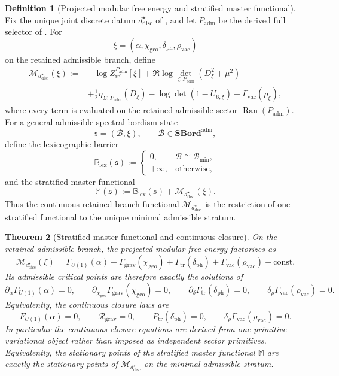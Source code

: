 \documentclass[11pt,a4paper]{article}
\newtheorem{theorem}{Theorem}[section]
\theoremstyle{definition}
\newtheorem{definition}[theorem]{Definition}
\theoremstyle{remark}
\newcommand{\chigeo}{\chi_{\mathrm{geo}}}
\newcommand{\Padm}{P_{\mathrm{adm}}}
\begin{document}
\begin{definition}[Projected modular free energy and stratified master functional]
\label{def:projected-modular-free-energy}
Fix the unique joint discrete datum $d^\star_{\mathrm{disc}}$ of
, and let $\Padm$ be the derived full selector of
. For
\[
\xi=(\alpha,\chigeo,\delta_{\mathrm{ph}},\rho_{\mathrm{vac}})
\]
on the retained admissible branch, define
\[
\begin{aligned}
\mathcal M_{d^\star_{\mathrm{disc}}}(\xi)
:={}&-\log Z^{\Padm}_{\mathrm{rel}}[\xi]
+\Re\log\det_{\zeta,\Padm}(D_\xi^2+\mu^2)\\
&+\frac12\eta_{\Sigma,\Padm}(D_\xi)
-\log\det(1-U_{6,\xi})
+\Gamma_{\mathrm{vac}}(\rho_\xi),
\end{aligned}
\]
where every term is evaluated on the retained admissible sector $\operatorname{Ran}(\Padm)$.
For a general admissible spectral-bordism state
\[
\mathfrak s=(\mathcal B,\xi),
\qquad
\mathcal B\in\mathbf{SBord}^{\mathrm{adm}},
\]
define the lexicographic barrier
\[
\mathbb B_{\mathrm{lex}}(\mathfrak s)
:=
\begin{cases}
0,& \mathcal B\cong \mathcal B_{\min},\\
+\infty,& \text{otherwise},
\end{cases}
\]
and the stratified master functional
\[
\mathbb M(\mathfrak s)
:=
\mathbb B_{\mathrm{lex}}(\mathfrak s)+\mathcal M_{d^\star_{\mathrm{disc}}}(\xi).
\]
Thus the continuous retained-branch functional $\mathcal M_{d^\star_{\mathrm{disc}}}$ is the
restriction of one stratified functional to the unique minimal admissible stratum.
\end{definition}

\begin{theorem}[Stratified master functional and continuous closure]
\label{thm:continuous-closure-from-master-functional}
On the retained admissible branch, the projected modular free energy factorizes as
\[
\mathcal M_{d^\star_{\mathrm{disc}}}(\xi)
=
\Gamma_{U(1)}(\alpha)
+
\Gamma_{\mathrm{grav}}(\chigeo)
+
\Gamma_{\mathrm{tr}}(\delta_{\mathrm{ph}})
+
\Gamma_{\mathrm{vac}}(\rho_{\mathrm{vac}})
+\mathrm{const}.
\]
Its admissible critical points are therefore exactly the solutions of
\[
\partial_\alpha\Gamma_{U(1)}(\alpha)=0,
\qquad
\partial_{\chigeo}\Gamma_{\mathrm{grav}}(\chigeo)=0,
\qquad
\partial_\delta\Gamma_{\mathrm{tr}}(\delta_{\mathrm{ph}})=0,
\qquad
\delta_\rho\Gamma_{\mathrm{vac}}(\rho_{\mathrm{vac}})=0.
\]
Equivalently, the continuous closure laws are
\[
F_{U(1)}(\alpha)=0,
\qquad
\mathcal R_{\mathrm{grav}}=0,
\qquad
P_{\mathrm{tr}}(\delta_{\mathrm{ph}})=0,
\qquad
\delta_\rho\Gamma_{\mathrm{vac}}(\rho_{\mathrm{vac}})=0.
\]
In particular the continuous closure equations are derived from one primitive variational object
rather than imposed as independent sector primitives. Equivalently, the stationary points of the
stratified master functional $\mathbb M$ are exactly the stationary points of
$\mathcal M_{d^\star_{\mathrm{disc}}}$ on the minimal admissible stratum.
\end{theorem}
\end{document}
